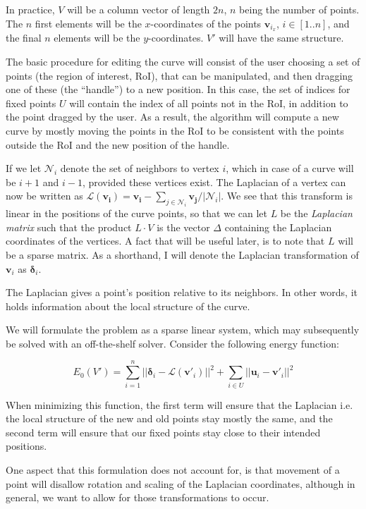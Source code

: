 \documentclass[english]{article}
\begin{document}
In practice, $V$ will be a column vector of length $2n$, $n$ being the number of points. The $n$ first elements will be the $x$-coordinates of the points $\mathbf{v}_{i_x}$, $i \in [1..n]$, and the final $n$ elements will be the $y$-coordinates. $V'$ will have the same structure.

The basic procedure for editing the curve will consist of the user choosing a set of points (the region of interest, RoI), that can be manipulated, and then dragging one of these (the ``handle'') to a new position. In this case, the set of indices for fixed points $U$ will contain the index of all points not in the RoI, in addition to the point dragged by the user. As a result, the algorithm will compute a new curve by mostly moving the points in the RoI to be consistent with the points outside the RoI and the new position of the handle.

If we let $\mathcal{N}_i$ denote the set of neighbors to vertex $i$, which in case of a curve  will be $i+1$ and $i - 1$, provided these vertices exist. The Laplacian of a vertex can now be written as $\mathcal{L}(\mathbf{v_i}) = \mathbf{v_i} - \sum_{j \in \mathcal{N}_i}\mathbf{v_j} / |\mathcal{N}_i|$. We see that this transform is linear in the positions of the curve points, so that we can let $L$ be the \textit{Laplacian matrix} such that the product $L\cdot V$ is the vector $\Delta$ containing the Laplacian coordinates of the vertices. A fact that will be useful later, is to note that $L$ will be a sparse matrix. As a shorthand, I will denote the Laplacian transformation of $\mathbf{v}_i$ as $\mathbf{\delta}_i$.

The Laplacian gives a point's position relative to its neighbors. In other words, it holds information about the local structure of the curve.

We will formulate the problem as a sparse linear system, which may subsequently be solved with an off-the-shelf solver. Consider the following energy function:

\[
E_0(V') = \sum_{i = 1}^n || \mathbf{\delta}_i - \mathcal{L}(\mathbf{v'}_i) ||^2 + \sum_{i \in U} || \mathbf{u}_i - \mathbf{v'}_i||^2
\]

When minimizing this function, the first term will ensure that the Laplacian i.e. the local structure of the new and old points stay mostly the same, and the second term will ensure that our fixed points stay close to their intended positions. %

One aspect that this formulation does not account for, is that movement of a point will disallow rotation and scaling of the Laplacian coordinates, although in general, we want to allow for those transformations to occur. 
\end{document}
